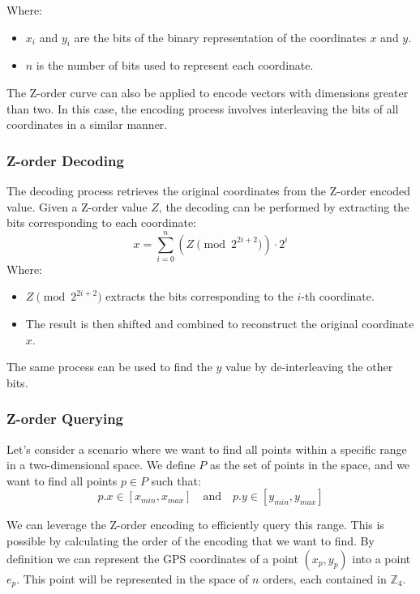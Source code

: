 Where:
\begin{itemize}
    \item \( x_i \) and \( y_i \) are the bits of the binary representation of the coordinates \( x \) and \( y \).
    \item \( n \) is the number of bits used to represent each coordinate.
\end{itemize}

The Z-order curve can also be applied to encode vectors with dimensions greater than two. In this case, the encoding process involves interleaving the bits of all coordinates in a similar manner.


\subsubsection{Z-order Decoding}
The decoding process retrieves the original coordinates from the Z-order encoded value. Given a Z-order value \( Z \), the decoding can be performed by extracting the bits corresponding to each coordinate:
\[
    x = \sum_{i=0}^{n} (Z \pmod{ 2^{2i+2} }) \cdot 2^i
\]
Where:
\begin{itemize}
    \item \( Z \pmod{ 2^{2i+2} } \) extracts the bits corresponding to the \( i \)-th coordinate.
    \item The result is then shifted and combined to reconstruct the original coordinate \( x \).
\end{itemize}

The same process can be used to find the $y$ value by de-interleaving the other bits.

\subsubsection{Z-order Querying}
Let's consider a scenario where we want to find all points within a specific range in a two-dimensional space. We define \( P \) as the set of points in the space, and we want to find all points \( p \in P \) such that:
\[
    p.x \in [x_{min}, x_{max}] \quad \text{and} \quad p.y \in [y_{min}, y_{max}]
\]

We can leverage the Z-order encoding to efficiently query this range. This is possible by calculating the order of the encoding that we want to find. 
By definition we can represent the GPS coordinates of a point \( (x_p, y_p) \) into a point \( e_p \). This point will be represented in the space of \( n \) orders, each contained in \( \mathbb{Z}_4 \).

